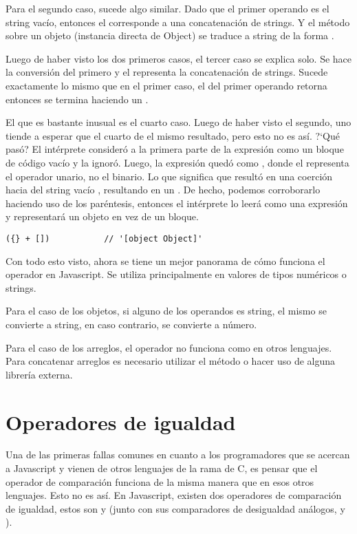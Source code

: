 Para el segundo caso, sucede algo similar. Dado que el primer operando es el string vacío, entonces el \code{+} corresponde a una concatenación de strings. Y el método  sobre un objeto (instancia directa de Object) se traduce a string de la forma .

Luego de haber visto los dos primeros casos, el tercer caso se explica solo. Se hace la conversión del primero y el \code{+} representa la concatenación de strings. Sucede exactamente lo mismo que en el primer caso, el  del primer operando retorna  entonces se termina haciendo un .

El que es bastante inusual es el cuarto caso. Luego de haber visto el segundo, uno tiende a esperar que el cuarto de el mismo resultado, pero esto no es así. ?`Qué pasó? El intérprete consideró a la primera parte de la expresión como un bloque de código vacío y la ignoró. Luego, la expresión quedó como \code{+[]}, donde el \code{+} representa el operador unario, no el binario. Lo que significa que resultó en una coerción hacia  del string vacío , resultando en un . De hecho, podemos corroborarlo haciendo uso de los paréntesis, entonces el intérprete lo leerá como una expresión y \code{\{\}} representará un objeto en vez de un  bloque.

\begin{lstlisting}[title={Caso especial}]
({} + [])			// '[object Object]'
\end{lstlisting}

Con todo esto visto, ahora se tiene un mejor panorama de cómo funciona el operador \code{+} en Javascript. Se utiliza principalmente en valores de tipos numéricos o strings. 

Para el caso de los objetos, si alguno de los operandos es string, el mismo se convierte a string, en caso contrario, se convierte a número. 

Para el caso de los arreglos, el operador \code{+} no funciona como en otros lenguajes. Para concatenar arreglos es necesario utilizar el método  o hacer uso de alguna librería externa.

\section{Operadores de igualdad}
\label{sec:eqeqeq}

Una de las primeras fallas comunes en cuanto a los programadores que se acercan a Javascript y vienen de otros lenguajes de la rama de C, es pensar que el operador de comparación \code{==} funciona de la misma manera que en esos otros lenguajes. Esto no es así. En Javascript, existen dos operadores de comparación de igualdad, estos son \code{==} y \code{===} (junto con sus comparadores de desigualdad análogos, \code{!=} y \code{!==}).

